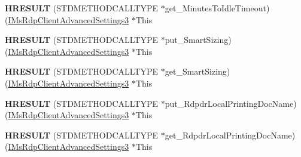 \begin{DoxyCompactItemize}
\item 
\mbox{\label{struct_m_s_t_s_c_lib_1_1_i_ms_rdp_client_advanced_settings3_vtbl_a6f08235394b2f95b54113a6dde7f9a93}} 
{\bfseries H\+R\+E\+S\+U\+LT} (S\+T\+D\+M\+E\+T\+H\+O\+D\+C\+A\+L\+L\+T\+Y\+PE $\ast$get\+\_\+\+Minutes\+To\+Idle\+Timeout)(\hyperlink{interface_m_s_t_s_c_lib_1_1_i_ms_rdp_client_advanced_settings3}{I\+Ms\+Rdp\+Client\+Advanced\+Settings3} $\ast$This
\item 
\mbox{\label{struct_m_s_t_s_c_lib_1_1_i_ms_rdp_client_advanced_settings3_vtbl_a49a2bc1adf0135206aaf2b6eecdfc206}} 
{\bfseries H\+R\+E\+S\+U\+LT} (S\+T\+D\+M\+E\+T\+H\+O\+D\+C\+A\+L\+L\+T\+Y\+PE $\ast$put\+\_\+\+Smart\+Sizing)(\hyperlink{interface_m_s_t_s_c_lib_1_1_i_ms_rdp_client_advanced_settings3}{I\+Ms\+Rdp\+Client\+Advanced\+Settings3} $\ast$This
\item 
\mbox{\label{struct_m_s_t_s_c_lib_1_1_i_ms_rdp_client_advanced_settings3_vtbl_a50a7f3ffbdc52a50529590bd3017ba9d}} 
{\bfseries H\+R\+E\+S\+U\+LT} (S\+T\+D\+M\+E\+T\+H\+O\+D\+C\+A\+L\+L\+T\+Y\+PE $\ast$get\+\_\+\+Smart\+Sizing)(\hyperlink{interface_m_s_t_s_c_lib_1_1_i_ms_rdp_client_advanced_settings3}{I\+Ms\+Rdp\+Client\+Advanced\+Settings3} $\ast$This
\item 
\mbox{\label{struct_m_s_t_s_c_lib_1_1_i_ms_rdp_client_advanced_settings3_vtbl_a85be3509639092f6a478446b072d8341}} 
{\bfseries H\+R\+E\+S\+U\+LT} (S\+T\+D\+M\+E\+T\+H\+O\+D\+C\+A\+L\+L\+T\+Y\+PE $\ast$put\+\_\+\+Rdpdr\+Local\+Printing\+Doc\+Name)(\hyperlink{interface_m_s_t_s_c_lib_1_1_i_ms_rdp_client_advanced_settings3}{I\+Ms\+Rdp\+Client\+Advanced\+Settings3} $\ast$This
\item 
\mbox{\label{struct_m_s_t_s_c_lib_1_1_i_ms_rdp_client_advanced_settings3_vtbl_ab6c6e1ed3a0c02d661e64ae179f8aa52}} 
{\bfseries H\+R\+E\+S\+U\+LT} (S\+T\+D\+M\+E\+T\+H\+O\+D\+C\+A\+L\+L\+T\+Y\+PE $\ast$get\+\_\+\+Rdpdr\+Local\+Printing\+Doc\+Name)(\hyperlink{interface_m_s_t_s_c_lib_1_1_i_ms_rdp_client_advanced_settings3}{I\+Ms\+Rdp\+Client\+Advanced\+Settings3} $\ast$This

\end{DoxyCompactItemize}
